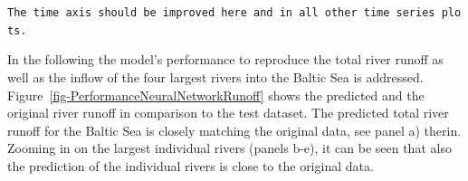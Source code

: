 \documentclass[
]{agujournal2019}
\begin{document}
\begin{figure}


\caption{\label{fig-statistical-evaluationNN}}

\end{figure}%

\texttt{The\ time\ axis\ should\ be\ improved\ here\ and\ in\ all\ other\ time\ series\ plots.}

In the following the model's performance to reproduce the total river
runoff as well as the inflow of the four largest rivers into the Baltic
Sea is addressed. Figure~\ref{fig-PerformanceNeuralNetworkRunoff} shows
the predicted and the original river runoff in comparison to the test
dataset. The predicted total river runoff for the Baltic Sea is closely
matching the original data, see panel a) therin. Zooming in on the
largest individual rivers (panels b-e), it can be seen that also the
prediction of the individual rivers is close to the original data.
\end{document}
